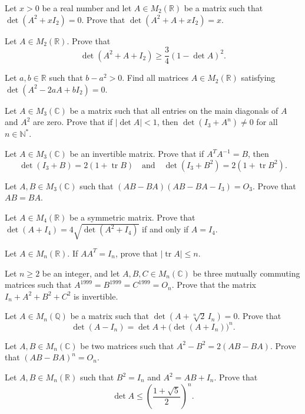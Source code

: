 \documentclass[12pt]{article}
\begin{document}
\begin{problems}
\item Let $x>0$ be a real number and let $A\in M_2(\mathbb{R})$ be a matrix such that $\det(A^2+xI_2)=0$. Prove that $\det(A^2+A+xI_2)=x$.

\item Let $A\in M_2(\mathbb{R})$. Prove that
\[
\det(A^2+A+I_2) \ge \frac{3}{4}(1-\det A)^2.
\]

\item Let $a,b\in\mathbb{R}$ such that $b-a^2>0$. Find all matrices $A\in M_2(\mathbb{R})$ satisfying $\det(A^2-2aA+bI_2)=0$.

\item Let $A\in M_3(\mathbb{C})$ be a matrix such that all entries on the main diagonals of $A$ and $A^2$ are zero. Prove that if $|\det A|<1$, then $\det(I_3+A^n)\ne 0$ for all $n\in\mathbb{N}^*$.

\item Let $A\in M_3(\mathbb{C})$ be an invertible matrix. Prove that if $A^TA^{-1}=B$, then
\[
\det(I_3+B) = 2(1+\operatorname{tr}B) \quad\text{and}\quad \det(I_3+B^2) = 2(1+\operatorname{tr}B^2).
\]

\item Let $A,B\in M_3(\mathbb{C})$ such that $(AB-BA)(AB-BA-I_3)=O_3$. Prove that $AB=BA$.

\item Let $A\in M_4(\mathbb{R})$ be a symmetric matrix. Prove that $\det(A+I_4) = 4\sqrt{\det(A^2+I_4)}$ if and only if $A=I_4$.

\item Let $A\in M_n(\mathbb{R})$. If $AA^T=I_n$, prove that $|\operatorname{tr}A|\le n$.

\item Let $n\ge 2$ be an integer, and let $A,B,C\in M_n(\mathbb{C})$ be three mutually commuting matrices such that $A^{1999}=B^{1999}=C^{1999}=O_n$. Prove that the matrix $I_n+A^2+B^2+C^2$ is invertible.

\item Let $A\in M_n(\mathbb{Q})$ be a matrix such that $\det\!\left(A+\sqrt[n]{2}\,I_n\right)=0$. Prove that
\[
\det(A-I_n) = \det A + \big(\det(A+I_n)\big)^n.
\]

\item Let $A,B\in M_n(\mathbb{C})$ be two matrices such that $A^2-B^2 = 2(AB-BA)$. Prove that $(AB-BA)^n = O_n$.

\item Let $A,B\in M_n(\mathbb{R})$ such that $B^2=I_n$ and $A^2=AB+I_n$. Prove that
\[
\det A \le \left(\frac{1+\sqrt5}{2}\right)^n.
\]


\end{problems}
\end{document}
